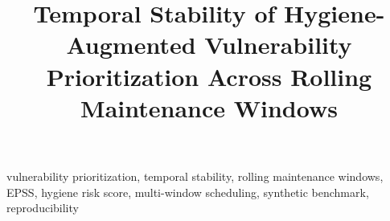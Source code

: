 \documentclass[journal]{IEEEtran}
\title{Temporal Stability of Hygiene-Augmented Vulnerability
Prioritization Across Rolling Maintenance Windows}
\author{%
  \IEEEauthorblockN{Harshavardhan Malla}
  \IEEEauthorblockA{Independent Researcher}%
}
\begin{document}
\maketitle

\begin{abstract}

\end{abstract}

\begin{IEEEkeywords}
vulnerability prioritization, temporal stability, rolling maintenance
windows, EPSS, hygiene risk score, multi-window scheduling,
synthetic benchmark, reproducibility
\end{IEEEkeywords}












\end{document}

